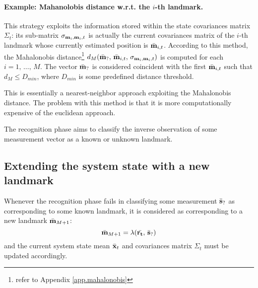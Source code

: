	\paragraph{Example: Mahanolobis distance w.r.t. the $i$-th landmark.}
		This strategy exploits the information stored within the state covariances matrix $\Sigma_t$: its sub-matrix $\sigma_{\boldsymbol{\mathrm{{m}}}_i,\boldsymbol{\mathrm{{m}}}_i,t}$ is actually the current covariances matrix of the $i$-th landmark whose currently estimated position is $\bar{\boldsymbol{\mathrm{{m}}}}_{i,t}$. 
		According to this method, the Mahalonobis distance\footnote{\label{sec.ekf.mahalobis}refer to Appendix \ref{app.mahalonobis}} $d_M(\bar{\boldsymbol{\mathrm{{m}}}}_?,\, \bar{\boldsymbol{\mathrm{{m}}}}_{i,t},\, \sigma_{\boldsymbol{\mathrm{{m}}}_i,\boldsymbol{\mathrm{{m}}}_i,t})$ is computed for each $i = 1,\, \ldots,\, M$.
		The vector $\bar{\boldsymbol{\mathrm{{m}}}}_?$ is considered coincident with the first $\bar{\boldsymbol{\mathrm{{m}}}}_{i,t}$ such that $d_M\leq D_{min}$, where $D_{min}$ is some predefined distance threshold.
		
		This is essentially a nearest-neighbor approach exploiting the Mahalonobis distance. 
		The problem with this method is that it is more computationally expensive of the euclidean approach.
	
	\vspace{1cm}	
	\begin{recap}
		The recognition phase aims to classify the inverse observation of some measurement vector as a known or unknown landmark.
	\end{recap}
		
\subsection{Extending the system state with a new landmark}
	\label{sec.state_extension}
	
	Whenever the recognition phase fails in classifying some measurement $\bar{\boldsymbol{\mathrm{{s}}}}_?$ as corresponding to some known landmark, it is considered as corresponding to a new landmark $\bar{\boldsymbol{\mathrm{{m}}}}_{M+1}$:
	\[
		\bar{\boldsymbol{\mathrm{{m}}}}_{M+1} = \lambda(\bar{\boldsymbol{\mathrm{{r_t}}}},\, \bar{\boldsymbol{\mathrm{{s}}}}_?)
	\]
	and the current system state mean $\bar{\boldsymbol{\mathrm{{x}}}}_{t}$ and covariances matrix $\Sigma_t$ must be updated accordingly.
	
